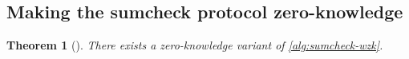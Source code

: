 \documentclass[english]{reedthesis}
\theoremstyle{plain}
\newtheorem{thm}{Theorem}[section]
\theoremstyle{definition}
\theoremstyle{remark}
\DeclarePairedDelimiter{\abs}{\lvert}{\rvert}
\newcommand{\middlemid}{%
  \ensuremath{\;\middle\vert\;}
}
\begin{document}
\subsection{Making the sumcheck protocol zero-knowledge}



\begin{thm}[{\cite{CFGS22}}]\label{thm:zk-sumcheck}
  There exists a zero-knowledge variant of \cref{alg:sumcheck-wzk}.
\end{thm}
\end{document}
